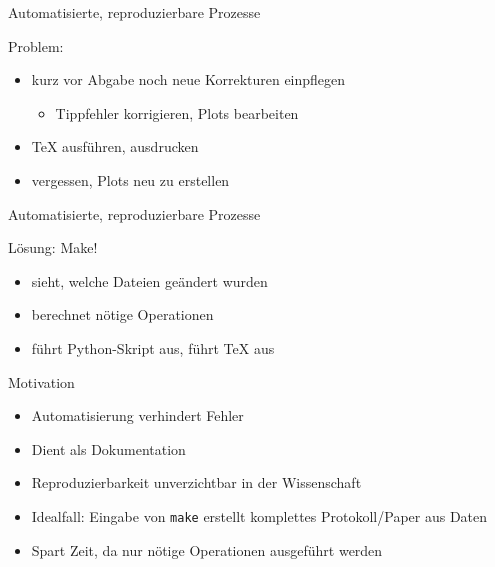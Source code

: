 \begin{frame}{Automatisierte, reproduzierbare Prozesse}

  {\huge Problem:}
  \vspace{1em}
  \begin{itemize}
    \item kurz vor Abgabe noch neue Korrekturen einpflegen
      \begin{itemize}
        \item Tippfehler korrigieren, Plots bearbeiten
      \end{itemize}
    \item \TeX{} ausführen, ausdrucken
    \item vergessen, Plots neu zu erstellen
  \end{itemize}
\end{frame}

\begin{frame}{Automatisierte, reproduzierbare Prozesse}

  {\huge Lösung: Make!}
  \vspace{1em}
  \begin{itemize}
    \item sieht, welche Dateien geändert wurden
    \item berechnet nötige Operationen
    \item führt Python-Skript aus, führt \TeX{} aus
  \end{itemize}
\end{frame}

\begin{frame}{Motivation}
  \begin{itemize}
    \item Automatisierung verhindert Fehler
    \item Dient als Dokumentation
    \item Reproduzierbarkeit unverzichtbar in der Wissenschaft
    \item Idealfall: Eingabe von \texttt{make} erstellt komplettes Protokoll/Paper aus Daten
    \item Spart Zeit, da nur nötige Operationen ausgeführt werden
  \end{itemize}
\end{frame}

